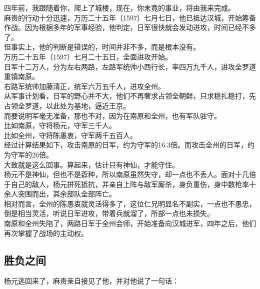 \begin{multicols}{\theparacolNo}
四年前，我跟随着你，爬上了城楼，现在，你未竟的事业，将由我来完成。\\

麻贵的行动十分迅速，万历二十五年（1597）七月七日，他已抵达汉城，开始筹备作战。因为根据多年的军事经验，他判定，日军很快就会发动进攻，时间已经不多了。\\

但事实上，他的判断是错误的，时间并非不多，而是根本没有。\\

万历二十五年（1597）七月二十五日，全面进攻开始。\\

日军十二万人，分为左右两路，左路军统帅小西行长，率四万九千人，进攻全罗道重镇南原。\\

右路军统帅加藤清正，统军六万五千人，进攻全州。\\

从军事计划看，日军的野心并不大，他们不再奢求占领全朝鲜，只求稳扎稳打，先占领全罗道，以此处为基地，逼近王京。\\

而要说明军毫无准备，那也不对，因为在南原和全州，也有军队驻守。\\

比如南原，守将杨元，守军三千人。\\

比如全州，守将陈愚衷，守军两千五百人。\\

经过计算结果如下，攻击南原的日军，约为守军的16.3倍。而攻击全州的日军，约为守军的26倍。\\

大致就是这么回事。算起来，估计只有神仙，才能守住。\\

杨元不是神仙，但也不是孬种，所以南原虽然失守，却一点也不丢人。面对十几倍于自己的敌人，杨元拼死抵抗，并亲自上阵与敌军厮杀，身负重伤，身中数枪率十余人突围而出，其余部队全部阵亡。\\

相对而言，全州的陈愚衷就灵活得多了，这位仁兄明显名不副实，一点也不愚忠，倒是相当灵活，听说日军进攻，带着兵就溜了，所部一点也未损失。\\

南原和全州失陷了，两路日军于全州会师，开始准备向汉城进军，四年之后，他们再次掌握了战场的主动权。\\

\subsection{胜负之间}
杨元逃回来了，麻贵亲自接见了他，并对他说了一句话：\\


\end{multicols}
